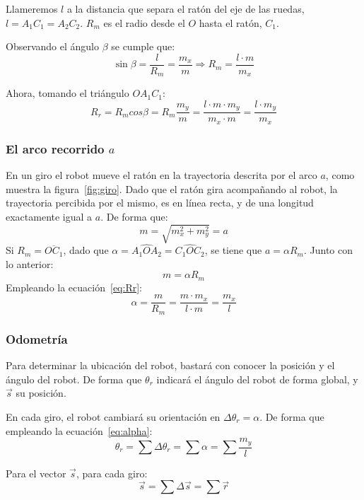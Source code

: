 \documentclass[10pt,a4paper,hidelinks,twocolumn]{article}
\begin{document}
Llameremos $l$ a la distancia que separa el ratón del eje de las ruedas, $l = 
A_1C_1 = A_2C_2$. $R_m$ es el radio desde el $O$ hasta el ratón, $C_1$.

Observando el ángulo $\beta$ se cumple que:
\begin{equation}
	\sin \beta = \frac{l}{R_m} = \frac{m_x}{m} \Longrightarrow
		R_m = \frac{l \cdot m}{m_x}
\label{eq:Rm}
\end{equation}

Ahora, tomando el triángulo $OA_1C_1$:
\begin{equation}
	R_r = R_m cos \beta = R_m \frac{m_y}{m} =
		\frac{l \cdot m \cdot m_y}{m_x \cdot m} =
		\frac{l \cdot m_y}{m_x}
\label{eq:Rr}
\end{equation}


\subsubsection{El arco recorrido $a$}
En un giro el robot mueve el ratón en la trayectoria descrita por el arco $a$, 
como muestra la figura~\ref{fig:giro}. Dado que el ratón gira acompañando al 
robot, la trayectoria percibida por el mismo, es en línea recta, y de una 
longitud exactamente igual a $a$. De forma que:
$$m = \sqrt{m_x^2 + m_y^2} = a$$
Si $R_m = \overline{OC_1}$, dado que  $\alpha = \widehat{A_1OA_2} = 
\widehat{C_1OC_2}$, se tiene que $a = \alpha R_m$. Junto con lo anterior:
$$ m = \alpha R_m $$
Empleando la ecuación~\ref{eq:Rr}:
\begin{equation}
	\alpha = \frac{m}{R_m} = \frac{m \cdot m_x}{l \cdot m} = \frac{m_x}{l}
	\label{eq:alpha}
\end{equation}

\subsubsection{Odometría}
Para determinar la ubicación del robot, bastará con conocer la posición y el 
ángulo del robot. De forma que $\theta_r$ indicará el ángulo del robot de forma 
global, y $\vec{s}$ su posición.

En cada giro, el robot cambiará su orientación en $\Delta\theta_r = \alpha$. De 
forma que empleando la ecuación~\ref{eq:alpha}:
$$ \theta_r = \sum \Delta \theta_r = \sum \alpha = \sum \frac{m_y}{l}$$

Para el vector $\vec{s}$, para cada giro:
$$ \vec{s} = \sum \Delta \vec{s} = \sum \vec{r} $$
\end{document}
